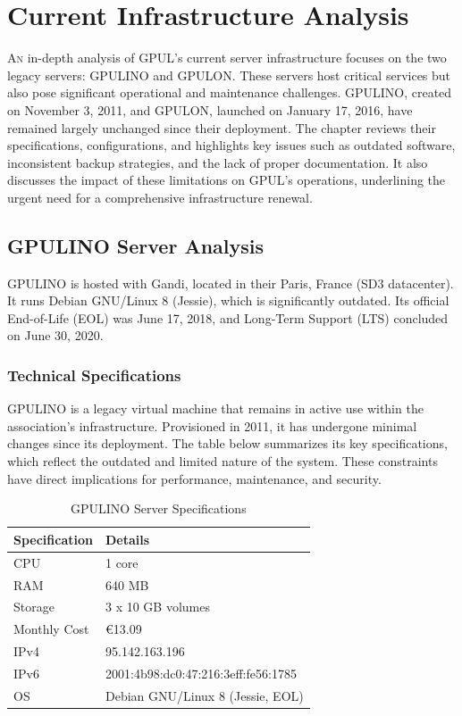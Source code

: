 %

\chapter{Current Infrastructure Analysis}
\label{chap:current-infrastructure}

\lettrine{A}{n} in-depth analysis of GPUL's current server infrastructure focuses on the two legacy servers: GPULINO and GPULON. These servers host critical services but also pose significant operational and maintenance challenges. GPULINO, created on November 3, 2011, and GPULON, launched on January 17, 2016, have remained largely unchanged since their deployment. The chapter reviews their specifications, configurations, and highlights key issues such as outdated software, inconsistent backup strategies, and the lack of proper documentation. It also discusses the impact of these limitations on GPUL's operations, underlining the urgent need for a comprehensive infrastructure renewal.

\section{GPULINO Server Analysis}

GPULINO is hosted with Gandi, located in their Paris, France (SD3 datacenter). It runs Debian GNU/Linux 8 (Jessie), which is significantly outdated. Its official End-of-Life (EOL) was June 17, 2018, and Long-Term Support (LTS) concluded on June 30, 2020.

\subsection*{Technical Specifications}

GPULINO is a legacy virtual machine that remains in active use within the association's infrastructure. Provisioned in 2011, it has undergone minimal changes since its deployment. The table below summarizes its key specifications, which reflect the outdated and limited nature of the system. These constraints have direct implications for performance, maintenance, and security.

\begin{table}[H]
  \centering
  \caption{GPULINO Server Specifications}
  \label{tab:gpulino_specs}
  \begin{tabular}{ll}
    \rowcolor{udcpink!25}
    \textbf{Specification} & \textbf{Details} \\
    \hline
    CPU & 1 core \\
    RAM & 640 MB \\
    Storage & 3 x 10 GB volumes \\
    Monthly Cost & €13.09 \\
    IPv4 & 95.142.163.196 \\
    IPv6 & 2001:4b98:dc0:47:216:3eff:fe56:1785 \\
    OS & Debian GNU/Linux 8 (Jessie, EOL) \\
  \end{tabular}
\end{table}

